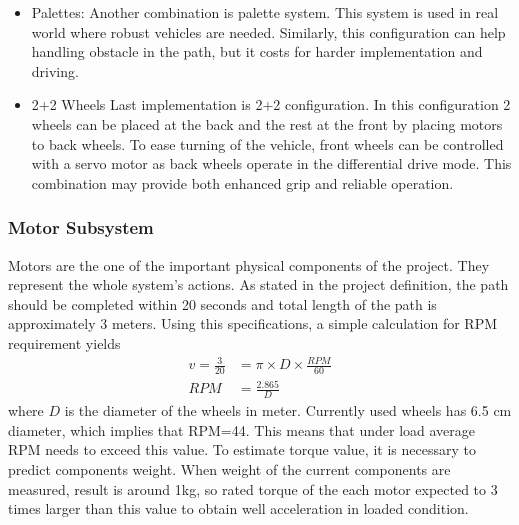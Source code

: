 \documentclass[a4paper,12pt]{article}
\begin{document}
	\begin{itemize}
		\item{Palettes:} 	Another combination is palette system. This system is used in real world where robust vehicles are needed. Similarly, this configuration can help handling obstacle in the path, but it costs for harder implementation and driving.
		
		\item{2+2 Wheels} 	Last implementation is 2+2 configuration. In this configuration 2 wheels can be placed at the back and the rest at the front by placing motors to back wheels. To ease turning of the vehicle, front wheels can be controlled with a servo motor as back wheels operate in the differential drive mode. This combination may provide both enhanced grip and reliable	 operation.
	\end{itemize}


	
	\subsubsection{Motor Subsystem}
	Motors are the one of the important physical components of the project. They represent the whole system's actions. As stated in the project definition, the path should be completed within 20 seconds and total length of the path is approximately 3 meters. Using this specifications, a simple calculation for RPM requirement yields
	\begin{equation}
	\begin{split}
	v=\frac{3}{20}&=\pi\times D\times\frac{RPM}{60}\\
	RPM&=\frac{2.865}{D}
	\end{split}
	\end{equation}
	where $D $ is the diameter of the wheels in meter. Currently used wheels has 6.5 cm diameter, which implies that RPM=44. This means that under load average RPM needs to exceed this value. To estimate torque value, it is necessary to predict components weight. When weight of the current components are measured, result is around 1kg, so rated torque of the each motor expected to 3 times larger than this value to obtain well acceleration in loaded condition. \\
	   
\end{document}
